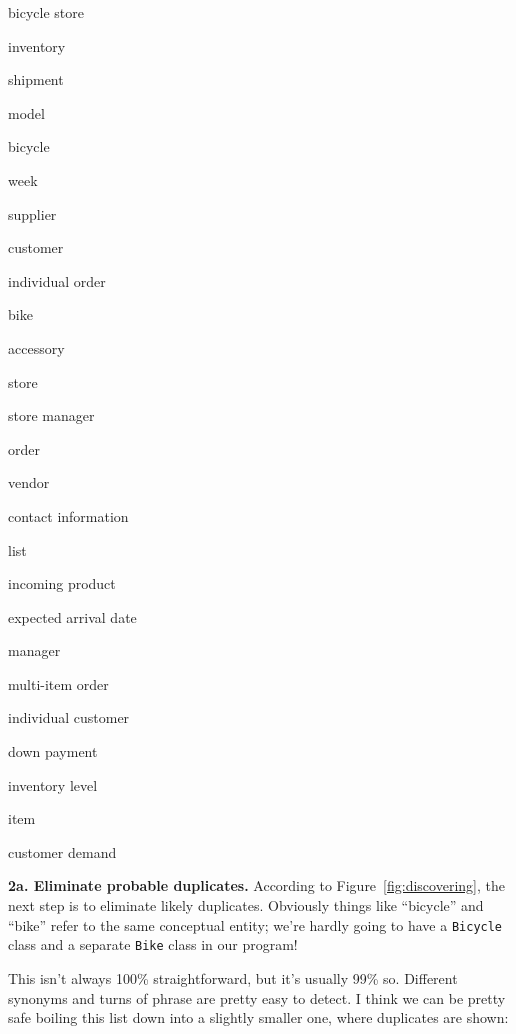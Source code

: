 \begin{samepage}
\begin{multicols}{3}
\small
\begin{compactitem}
\renewcommand\labelitemi{\raisebox{0.25ex}{\tiny$\bullet$}}
\item \textsf{bicycle store}
\item \textsf{inventory}
\item \textsf{shipment}
\item \textsf{model}
\item \textsf{bicycle}
\item \textsf{week}
\item \textsf{supplier}
\item \textsf{customer}
\item \textsf{individual order}
\columnbreak
\item \textsf{bike}
\item \textsf{accessory}
\item \textsf{store}
\item \textsf{store manager}
\item \textsf{order}
\item \textsf{vendor}
\item \textsf{contact information}
\item \textsf{list}
\item \textsf{incoming product}
\columnbreak
\item \textsf{expected arrival date}
\item \textsf{manager}
\item \textsf{multi-item order}
\item \textsf{individual customer}
\item \textsf{down payment}
\item \textsf{inventory level}
\item \textsf{item}
\item \textsf{customer demand}
\end{compactitem}
\end{multicols}
\end{samepage}

\textbf{2a. Eliminate probable duplicates.} According to
Figure~\ref{fig:discovering}, the next step is to eliminate likely duplicates.
Obviously things like ``bicycle'' and ``bike'' refer to the same conceptual
entity; we're hardly going to have a \texttt{Bicycle} class and a separate
\texttt{Bike} class in our program!

This isn't always 100\% straightforward, but it's usually 99\% so. Different
synonyms and turns of phrase are pretty easy to detect. I think we can be
pretty safe boiling this list down into a slightly smaller one, where
duplicates are shown:

